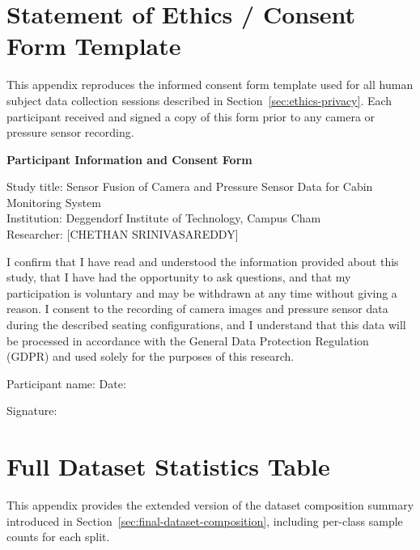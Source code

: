 
\chapter{Statement of Ethics / Consent Form Template}
\label{app:ethics-consent}
This appendix reproduces the informed consent form template used for all
human subject data collection sessions described in
Section~\ref{sec:ethics-privacy}. Each participant received and signed a
copy of this form prior to any camera or pressure sensor recording.

\bigskip
\noindent\textbf{Participant Information and Consent Form}

\bigskip
\noindent Study title: Sensor Fusion of Camera and Pressure Sensor Data
for Cabin Monitoring System\\
Institution: Deggendorf Institute of Technology, Campus Cham\\
Researcher: [CHETHAN SRINIVASAREDDY]

\bigskip
\noindent I confirm that I have read and understood the information
provided about this study, that I have had the opportunity to ask
questions, and that my participation is voluntary and may be withdrawn at
any time without giving a reason. I consent to the recording of camera
images and pressure sensor data during the described seating
configurations, and I understand that this data will be processed in
accordance with the General Data Protection Regulation (GDPR) and used
solely for the purposes of this research.

\bigskip
\noindent Participant name: \makebox[6cm]{\hrulefill} \quad
Date: \makebox[3cm]{\hrulefill}

\bigskip
\noindent Signature: \makebox[6cm]{\hrulefill}


\chapter{Full Dataset Statistics Table}
\label{app:dataset-statistics}
This appendix provides the extended version of the dataset composition
summary introduced in Section~\ref{sec:final-dataset-composition},
including per-class sample counts for each split.


